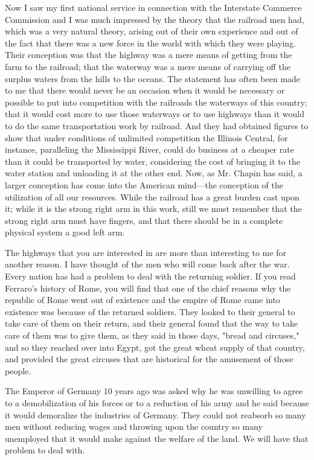 \begin{linenumbers*}
\indent Now I saw my first national service in connection with the Interstate Commerce Commission and I was much impressed by the theory that the railroad men had, which was a very natural theory, arising out of their own experience and out of the fact that there was a new force in the world with which they were playing. Their conception was that the highway was a mere means of getting from the farm to the railroad; that the waterway was a mere means of carrying off the surplus waters from the hills to the oceans. The statement has often been made to me that there would never be an occasion when it would be necessary or possible to put into competition with the railroads the waterways of this country; that it would cost more to use those waterways or to use highways than it would to do the same transportation work by railroad. And they had obtained figures to show that under conditions of unlimited competition the Illinois Central, for instance, paralleling the Mississippi River, could do business at a cheaper rate than it could be transported by water, considering the cost of bringing it to the water station and unloading it at the other end. Now, as Mr. Chapin has said, a larger conception has come into the American mind—the conception of the utilization of all our resources. While the railroad has a great burden cast upon it; while it is the strong right arm in this work, still we must remember that the strong right arm must have fingers, and that there should be in a complete physical system a good left arm.

\indent The highways that you are interested in are more than interesting to me for another reason. I have thought of the men who will come back after the war. Every nation has had a problem to deal with the returning soldier. If you read Ferraro's history of Rome, you will find that one of the chief reasons why the republic of Rome went out of existence and the empire of Rome came into existence was because of the returned soldiers. They looked to their general to take care of them on their return, and their general found that the way to take care of them was to give them, as they said in those days, "bread and circuses," and so they reached over into Egypt, got the great wheat supply of that country, and provided the great circuses that are historical for the amusement of those people.

\indent The Emperor of Germany 10 years ago was asked why he was unwilling to agree to a demobilization of his forces or to a reduction of his army and he said because it would demoralize the industries of Germany. They could not reabsorb so many men without reducing wages and throwing upon the country so many unemployed that it would make against the welfare of the land. We will have that problem to deal with.


\end{linenumbers*}
